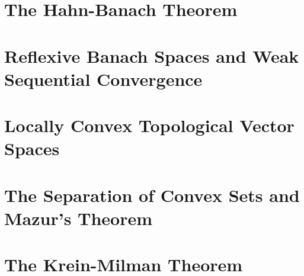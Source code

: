 \section{The Hahn-Banach Theorem}

\section{Reflexive Banach Spaces and Weak Sequential Convergence}

\section{Locally Convex Topological Vector Spaces}

\section{The Separation of Convex Sets and Mazur's Theorem}

\section{The Krein-Milman Theorem}
